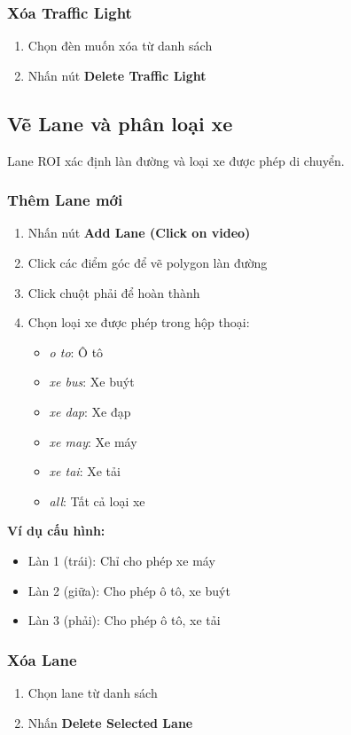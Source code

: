 \subsubsection{Xóa Traffic Light}
\begin{enumerate}
    \item Chọn đèn muốn xóa từ danh sách
    \item Nhấn nút \textbf{Delete Traffic Light}
\end{enumerate}

\subsection{Vẽ Lane và phân loại xe}

Lane ROI xác định làn đường và loại xe được phép di chuyển.

\subsubsection{Thêm Lane mới}
\begin{enumerate}
    \item Nhấn nút \textbf{Add Lane (Click on video)}
    \item Click các điểm góc để vẽ polygon làn đường
    \item Click chuột phải để hoàn thành
    \item Chọn loại xe được phép trong hộp thoại:
    \begin{itemize}
        \item \textit{o to}: Ô tô
        \item \textit{xe bus}: Xe buýt
        \item \textit{xe dap}: Xe đạp
        \item \textit{xe may}: Xe máy
        \item \textit{xe tai}: Xe tải
        \item \textit{all}: Tất cả loại xe
    \end{itemize}
\end{enumerate}

\textbf{Ví dụ cấu hình:}
\begin{itemize}
    \item Làn 1 (trái): Chỉ cho phép xe máy
    \item Làn 2 (giữa): Cho phép ô tô, xe buýt
    \item Làn 3 (phải): Cho phép ô tô, xe tải
\end{itemize}

\subsubsection{Xóa Lane}
\begin{enumerate}
    \item Chọn lane từ danh sách
    \item Nhấn \textbf{Delete Selected Lane}
\end{enumerate}

